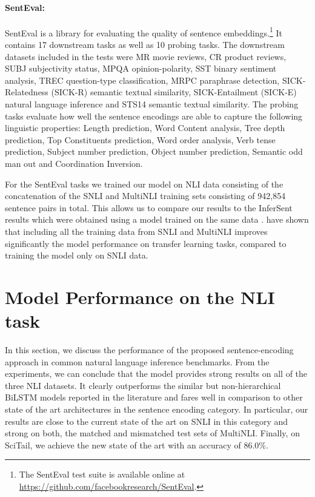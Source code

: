 \documentclass{nle}
\begin{document}
\paragraph{SentEval:}
SentEval \citep{infersent,SentEval} is a library for evaluating the quality of sentence embeddings.\footnote{The SentEval test suite is available online at \url{https://github.com/facebookresearch/SentEval}.} It contains 17 downstream tasks as well as 10 probing tasks. The downstream datasets included in the tests were MR movie reviews, CR product reviews, SUBJ subjectivity status, MPQA opinion-polarity, SST binary sentiment analysis, TREC question-type classification, MRPC paraphrase detection, SICK-Relatedness (SICK-R) semantic textual similarity, SICK-Entailment (SICK-E) natural language inference and STS14 semantic textual similarity. The probing tasks evaluate how well the sentence encodings are able to capture the following linguistic properties: Length prediction, Word Content analysis, Tree depth prediction, Top Constituents prediction, Word order analysis, Verb tense prediction, Subject number prediction, Object number prediction, Semantic odd man out and Coordination Inversion.

For the SentEval tasks we trained our model on NLI data consisting of the concatenation of the SNLI and MultiNLI training sets consisting of 942,854 sentence pairs in total.  This allows us to compare our results to the InferSent results which were obtained using a model trained on the same data \citep{infersent}. \cite{infersent} have shown that including all the training data from SNLI and MultiNLI improves significantly the model performance on transfer learning tasks, compared to training the model only on SNLI data.


\section{Model Performance on the NLI task}

In this section, we discuss the performance of the proposed sentence-encoding approach in common natural language inference benchmarks. From the experiments, we can conclude that the model provides strong results on all of the three NLI datasets. It clearly outperforms the similar but non-hierarchical BiLSTM models reported in the literature and fares well in comparison to other state of the art architectures in the sentence encoding category. In particular, our results are close to the current state of the art on SNLI in this category and strong on both, the matched and mismatched test sets of MultiNLI. Finally, on SciTail, we achieve the new state of the art with an accuracy of 86.0\%.
\end{document}
